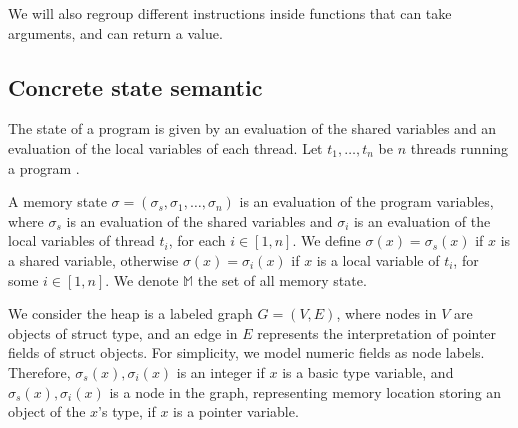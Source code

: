 \documentclass{llncs}
\newcommand{\Memory}{\mathbb{M}}
\begin{document}
We will also regroup different instructions inside functions that can take arguments, and can return a value.
	
	\subsection{Concrete state semantic}
	
	

The state of a program is given by an evaluation of the shared variables and an evaluation of the local variables of each thread. 
Let $t_1,\ldots, t_n$ be $n$ threads running a program \prog. 



A memory state $\sigma=(\sigma_s, \sigma_{1}, \ldots ,\sigma_{n})$ is an evaluation of the program variables, where $\sigma_s$ is an evaluation of the shared variables and $\sigma_{i}$ is an evaluation of the local variables of thread $t_i$, for each $i\in [1,n]$. 
We define 
$\sigma(x)=\sigma_s(x)$ if $x$ is a shared variable, otherwise $\sigma(x)=\sigma_i(x)$ if $x$ is a local variable of $t_i$, for some $i\in[1,n]$.  We denote $\Memory$ the set of all memory state. 

We consider the heap is a  labeled graph $G=(V,E)$, where nodes in $V$ are objects of struct type, and an edge in $E$  represents the interpretation of pointer fields of struct objects. For simplicity, we model numeric fields as node labels. 
Therefore, 
$\sigma_s(x), \sigma_i(x) $ is an integer if $x$ is a basic type variable, and 
$\sigma_s(x), \sigma_i(x)$ is a node in the graph, representing memory location storing an object of the $x$'s type,  if $x$ is a pointer variable.  
\end{document}
